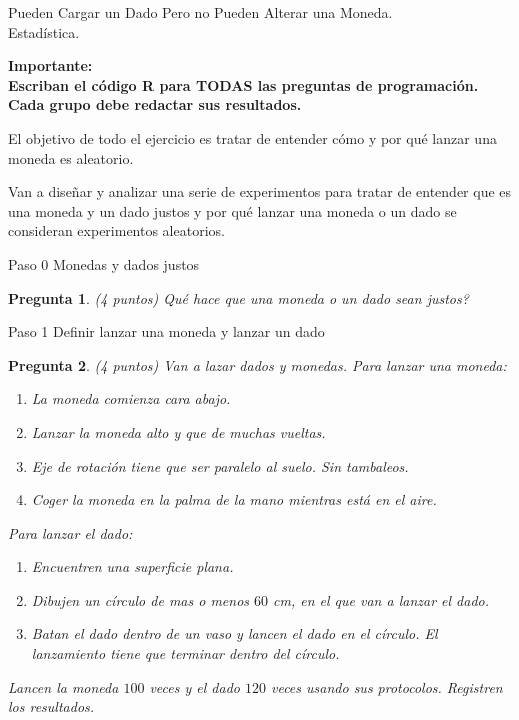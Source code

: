 \documentclass{article}
\newtheorem{pregunta}{Pregunta}
\def\die#1{{\domino#1}}
\newcommand{\skull}{\text{\usefont{U}{skulls}{m}{n}\symbol{'101}}}
\begin{document}
\begin{center}
  \Large Pueden Cargar un Dado Pero no Pueden Alterar una Moneda. \\
  \null
  Estadística.
\end{center}
\vspace{1cm}

\textbf{Importante:\\
 Escriban el código R para TODAS las preguntas de programación. \\ Cada grupo debe redactar sus resultados.}

\null\hfill

 El objetivo de todo el ejercicio es tratar de entender cómo y por qué lanzar una moneda es aleatorio.
\par
Van a diseñar y analizar una serie de experimentos para tratar de entender que es una moneda y un dado justos y por qué lanzar una moneda o un dado se consideran experimentos aleatorios.
 \begin{topbot}
   \vspace{0.7em}
   Paso 0 \quad Monedas y dados justos
   \vspace{0.7em}
 \end{topbot}

\begin{pregunta} (4 puntos)
Qué hace que una moneda o un dado sean justos?
\end{pregunta}

\begin{topbot}
  \vspace{0.7em}
  Paso 1 \quad Definir lanzar una moneda y lanzar un dado
  \vspace{0.7em}
\end{topbot}

\begin{pregunta} (4 puntos)
Van a lazar dados y monedas. Para lanzar una moneda:
\begin{enumerate}
  \item La moneda comienza cara abajo.
  \item Lanzar la moneda alto y que de muchas vueltas.
  \item Eje de rotación tiene que ser paralelo al suelo. Sin tambaleos.
  \item Coger la moneda en la palma de la mano mientras está en el aire.
\end{enumerate}
Para lanzar el dado:
\begin{enumerate}
  \item Encuentren una superficie plana.
  \item Dibujen un círculo de mas o menos $60$ cm, en el que van a lanzar el dado.
  \item Batan el dado dentro de un vaso y lancen el dado en el círculo. El lanzamiento tiene que terminar dentro del círculo.
\end{enumerate}

Lancen la moneda $100$ veces y el dado $120$ veces usando sus protocolos. Registren los resultados.

\end{pregunta}
\end{document}
